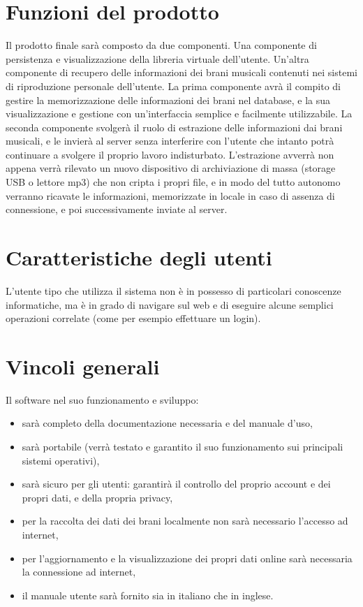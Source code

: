 \section{Funzioni del prodotto}
Il prodotto finale sar\`a composto da due componenti. Una componente di
persistenza e visualizzazione della libreria virtuale dell'utente. Un'altra
componente di recupero delle informazioni dei brani musicali contenuti nei
sistemi di riproduzione personale dell'utente. La prima componente avr\`a il
compito di gestire la memorizzazione delle informazioni dei brani nel database,
e la sua visualizzazione e gestione con un'interfaccia semplice e facilmente
utilizzabile. La seconda componente svolger\`a il ruolo di estrazione delle
informazioni dai brani musicali, e le invier\`a al server senza interferire con
l'utente che intanto potr\`a continuare a svolgere il proprio lavoro indisturbato.
L'estrazione avverr\`a non appena verr\`a rilevato un nuovo dispositivo di
archiviazione di massa (storage USB o lettore mp3) che non cripta i propri file,
e in modo del tutto autonomo verranno ricavate le informazioni, memorizzate in
locale in caso di assenza di connessione, e poi successivamente inviate al server.

\section{Caratteristiche degli utenti}
L'utente tipo che utilizza il sistema non \`e in possesso di particolari
conoscenze informatiche, ma \`e in grado di navigare sul web e di eseguire alcune
semplici operazioni correlate (come per esempio effettuare un login).

\section{Vincoli generali}
Il software nel suo funzionamento e sviluppo:
\begin{itemize}
  \item sar\`a completo della documentazione necessaria e del manuale d'uso,
  \item sar\`a portabile (verr\`a testato e garantito il suo funzionamento sui
  principali sistemi operativi),
  \item sar\`a sicuro per gli utenti: garantir\`a il controllo del proprio account e
  dei propri dati, e della propria privacy,
  \item per la raccolta dei dati dei brani localmente non sar\`a necessario
  l'accesso ad internet,
  \item per l'aggiornamento e la visualizzazione dei propri dati online sar\`a
  necessaria la connessione ad internet,
  \item il manuale utente sar\`a fornito sia in italiano che in inglese.
\end{itemize}

